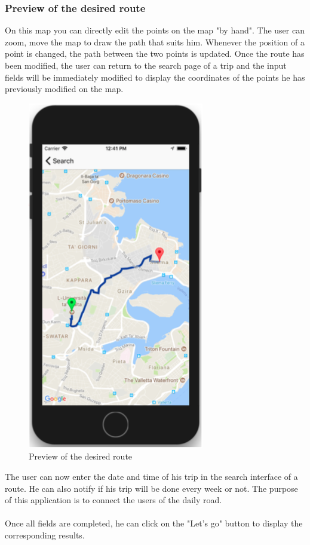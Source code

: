 \subsubsection{Preview of the desired route}

On this map you can directly edit the points on the map "by hand". The user can zoom, move the map to draw the path that suits him. Whenever the position of a point is changed, the path between the two points is updated. Once the route has been modified, the user can return to the search page of a trip and the input fields will be immediately modified to display the coordinates of the points he has previously modified on the map.

\begin{figure}[h!]
\begin{center}
\includegraphics[scale = 0.3]{diagrams/PreviewRoute.png} 
\end{center}
\caption{Preview of the desired route}
\end{figure}

The user can now enter the date and time of his trip in the search interface of a route. He can also notify if his trip will be done every week or not. The purpose of this application is to connect the users of the daily road.
\\\\
Once all fields are completed, he can click on the "Let's go" button to display the corresponding results.
\\\\

